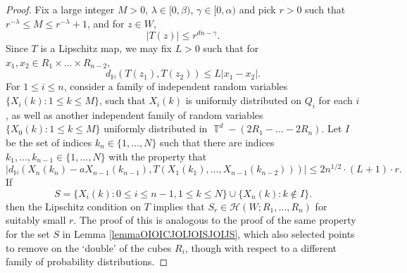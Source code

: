 \documentclass[dvipsnames,letterpaper,12pt]{article}
\numberwithin{equation}{section}
\DeclareMathOperator{\TT}{\mathbb{T}}
\numberwithin{theorem}{section}
\begin{document}
\begin{proof}
    Fix a large integer $M > 0$, $\lambda \in [0,\beta)$, $\gamma \in [0,\alpha)$ and pick $r > 0$ such that $r^{-\lambda} \leq M \leq r^{-\lambda} + 1$, and for $z \in W$,
    \[ |T(z)| \leq r^{dn - \gamma}. \]
    Since $T$ is a Lipschitz map, we may fix $L > 0$ such that for $x_1,x_2 \in R_1 \times \dots \times R_{n-2}$,
    \[ d_{\mathbb{H}}(T(z_1), T(z_2)) \leq L |x_1 - x_2|. \]
    For $1 \leq i \leq n$, consider a family of independent random variables $\{ X_i(k): 1 \leq k \leq M \}$, such that $X_i(k)$ is uniformly distributed on $Q_i$ for each $i$, as well as another independent family of random variables $\{ X_0(k): 1 \leq k \leq M \}$ uniformly distributed in $\TT^d - (2R_1 - \dots - 2R_n)$. Let $I$ be the set of indices $k_n \in \{ 1, \dots, N \}$ such that there are indices $k_1,\dots,k_{n-1} \in \{ 1, \dots, N \}$ with the property that
    \begin{equation}
        |d_{\mathbb{H}}(X_n(k_n) - a X_{n-1}(k_{n-1}), T(X_1(k_1), \dots, X_{n-1}(k_{n-2})))| \leq 2 n^{1/2} \cdot (L+1) \cdot r.
    \end{equation}
    If
    \[ S = \{ X_i(k) : 0 \leq i \leq n-1, 1 \leq k \leq N \} \cup \{ X_n(k): k \not \in I \}. \]
    then the Lipschitz condition on $T$ implies that $S_r \in \mathcal{H}(W;R_1,\dots,R_n)$ for suitably small $r$. The proof of this is analogous to the proof of the same property for the set $S$ in Lemma \ref{lemmaOIOICJOIJOISJOIJS}, which also selected points to remove on the `double' of the cubes $R_i$, though with respect to a different family of probability distributions.


\end{proof}
\end{document}
